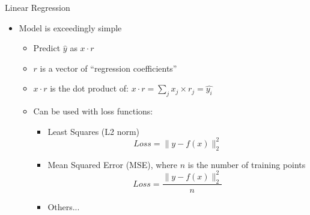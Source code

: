 \documentclass[aspectratio=169]{beamer}
\begin{document}
\begin{frame}{Linear Regression}

\begin{itemize}
	\item Model is exceedingly simple
	\begin{itemize}
		\item Predict $\hat{y}$ as $x \cdot r$
		\item $r$ is a vector of ``regression coefficients'' 
		\item $x \cdot r$ is the dot product of: $x \cdot r = \sum_j x_j \times r_j = \hat{y_i}$
		\item Can be used with loss functions:
		\begin {itemize}
			\item  Least Squares (L2 norm)  
			$$Loss = \lVert y - f(x)\rVert^2_2$$
			\item Mean Squared Error (MSE), where $n$ is the number of training points
			$$Loss =\frac{ \lVert y - f(x)\rVert^2_2}{n}$$
			\item Others...
		\end{itemize}
	\end{itemize}
\end{itemize}
\end{frame}
\end{document}
